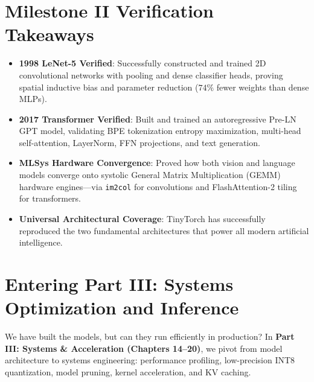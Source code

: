 \documentclass[
  letterpaper,
]{scrbook}
\providecommand{\tightlist}{%
  \setlength{\itemsep}{0pt}\setlength{\parskip}{0pt}}
\begin{document}

\section*{Milestone II Verification
Takeaways}\label{milestone-ii-verification-takeaways}


\begin{itemize}
\tightlist
\item
  \textbf{1998 LeNet-5 Verified}: Successfully constructed and trained
  2D convolutional networks with pooling and dense classifier heads,
  proving spatial inductive bias and parameter reduction (\(74\%\) fewer
  weights than dense MLPs).
\item
  \textbf{2017 Transformer Verified}: Built and trained an
  autoregressive Pre-LN GPT model, validating BPE tokenization entropy
  maximization, multi-head self-attention, LayerNorm, FFN projections,
  and text generation.
\item
  \textbf{MLSys Hardware Convergence}: Proved how both vision and
  language models converge onto systolic General Matrix Multiplication
  (GEMM) hardware engines---via \texttt{im2col} for convolutions and
  FlashAttention-2 tiling for transformers.
\item
  \textbf{Universal Architectural Coverage}: TinyTorch has successfully
  reproduced the two fundamental architectures that power all modern
  artificial intelligence.
\end{itemize}

\section*{Entering Part III: Systems Optimization and
Inference}\label{entering-part-iii-systems-optimization-and-inference}


We have built the models, but can they run efficiently in production? In
\textbf{Part III: Systems \& Acceleration (Chapters 14--20)}, we pivot
from model architecture to systems engineering: performance profiling,
low-precision INT8 quantization, model pruning, kernel acceleration, and
KV caching.
\end{document}
